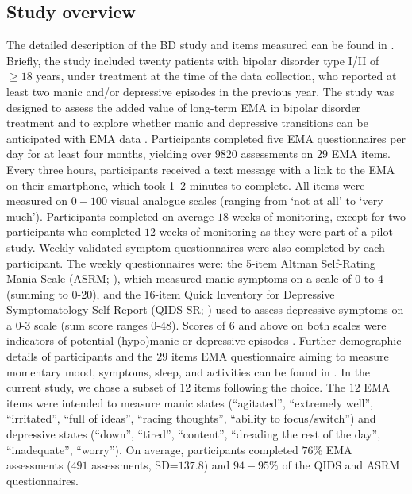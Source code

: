 \subsection{Study overview}
 The detailed description of the BD study and items measured can be found in \cite{Bos_Krieke_2020}. Briefly, the study included twenty patients with bipolar disorder type I/II of $\geq 18$ years, under treatment at the time of the data collection, who reported at least two manic and/or depressive episodes in the previous year. The study was designed to assess the added value of long-term EMA in bipolar disorder treatment \citep{Bos_Krieke_2020} and to explore whether manic and depressive transitions can be anticipated with EMA data \citep{Bos_2022}. Participants completed five EMA questionnaires per day for at least four months, yielding over $9820$ assessments on $29$ EMA items. Every three hours, participants received a text message with a link to the EMA on their smartphone, which took 1–2 minutes to complete. All items were measured on $0-100$ visual analogue scales (ranging from ‘not at all’ to ‘very much’). Participants completed on average $18$ weeks of monitoring, except for two participants who completed $12$ weeks of monitoring as they were part of a pilot study. Weekly validated symptom questionnaires were also completed by each participant. The weekly questionnaires were: the 5-item Altman Self-Rating Mania Scale (ASRM; \citealp{Altman_Hedeker_Peterson_Davis_1997}), which measured manic symptoms on a scale of 0 to 4 (summing to 0-20), and the 16-item Quick Inventory for Depressive Symptomatology Self-Report (QIDS-SR; \citealp{Rush_2003}) used to assess depressive symptoms on a 0-3 scale (sum score ranges 0-48). Scores of 6 and above on both scales were indicators of potential (hypo)manic or depressive episodes \citep{Bernstein_Rush_Suppes_Kyotoku_Warden_2010}. Further demographic details of participants and the $29$ items EMA questionnaire aiming to measure momentary mood, symptoms, sleep, and activities can be found in \cite{Bos_Krieke_2020}. In the current study, we chose a subset of $12$ items following the \cite{mildiner_moraga_bos_doornbos_bruggeman_van_2023} choice. The $12$ EMA items were intended to measure manic states (“agitated”, “extremely well”, “irritated”, “full of ideas”, “racing thoughts”, “ability to focus/switch”) and depressive states (“down”, “tired”, “content”, “dreading the rest of the day”, “inadequate”, “worry”). On average, participants completed $76\%$ EMA assessments ($491$ assessments, SD=$137.8$) and $94-95\%$ of the QIDS and ASRM questionnaires. 
